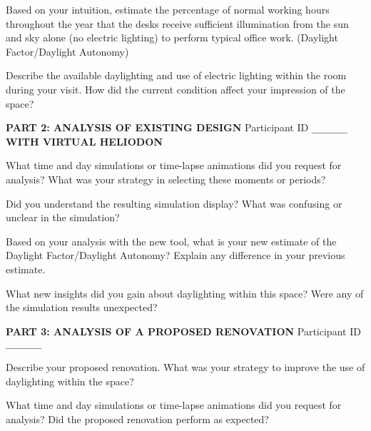 \documentclass[12pt]{article}
\begin{document}
\vspace{4.8in}


Based on your intuition, estimate the percentage of normal working
hours throughout the year that the desks receive sufficient
illumination from the sun and sky alone (no electric lighting) to
perform typical office work.  (Daylight Factor/Daylight Autonomy)


\vspace{0.9in}


Describe the available daylighting and use of electric lighting within
the room during your visit.  How did the current condition affect your
impression of the space?

\vspace{0.6in}


\newpage
{\bf PART 2: ANALYSIS OF EXISTING DESIGN }
\hfill Participant ID \verb+_______+\\
{\bf WITH VIRTUAL HELIODON }
\vspace{0.2in}

What time and day simulations or time-lapse animations did you request
for analysis?  What was your strategy in selecting these moments or periods?
\vspace{1.7in}


Did you understand the resulting simulation display?  What was
confusing or unclear in the simulation?
\vspace{1.65in}


Based on your analysis with the new tool, what is your new estimate of
the Daylight Factor/Daylight Autonomy?  Explain any difference in your
previous estimate.
\vspace{1.65in}



What new insights did you gain about daylighting within this space?
Were any of the simulation results unexpected?  
\vspace{1.7in}





\newpage

{\bf PART 3: ANALYSIS OF A PROPOSED RENOVATION } \hfill Participant ID
\verb+_______+
\vspace{0.2in}

Describe your proposed renovation.  What was your strategy to improve
the use of daylighting within the space?
\vspace{1.7in}


What time and day simulations or time-lapse animations did you request
for analysis?  Did the proposed renovation perform as expected?
\vspace{1.7in}
\end{document}
